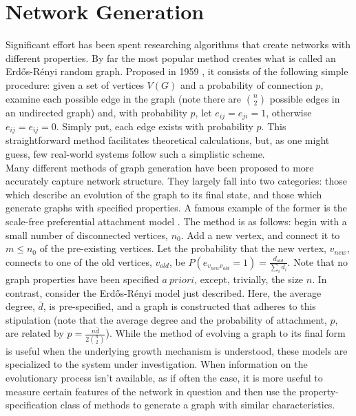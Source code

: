 \documentclass[11pt]{article}
\begin{document}
\section{Network Generation}
\label{sec:netGen}
\indent Significant effort has been spent researching algorithms that create networks with different properties. By far the most popular method creates what is called an Erd\H{o}s-R\'{e}nyi random graph. Proposed in 1959 \cite{Erdos1959}, it consists of the following simple procedure: given a set of vertices $V(G)$ and a probability of connection $p$, examine each possible edge in the graph (note there are ${n \choose 2}$ possible edges in an undirected graph) and, with probability $p$, let $e_{ij}=e_{ji}=1$, otherwise $e_{ij}=e_{ij}=0$. Simply put, each edge exists with probability $p$. This straightforward method facilitates theoretical calculations, but, as one might guess, few real-world systems follow such a simplistic scheme. \vspace{1mm}\\
\indent Many different methods of graph generation have been proposed to more accurately capture network structure. They largely fall into two categories: those which describe an evolution of the graph to its final state, and those which generate graphs with specified properties. A famous example of the former is the scale-free preferential attachment model \cite{Barabasi1999}. The method is as follows: begin with a small number of disconnected vertices, $n_{0}$. Add a new vertex, and connect it to $m\le n_{0}$ of the pre-existing vertices. Let the probability that the new vertex, $v_{new}$, connects to one of the old vertices, $v_{old}$, be $P(e_{v_{new}v_{old}}=1)=\frac{d_{old}}{\sum\limits_{i} d_{i}}$. Note that no graph properties have been specified $a\ priori$, except, trivially, the size $n$. In contrast, consider the Erd\H{o}s-R\'{e}nyi model just described. Here, the average degree, $\bar{d}$, is pre-specified, and a graph is constructed that adheres to this stipulation (note that the average degree and the probability of attachment, $p$, are related by $p=\frac{n\bar{d}}{2 {n \choose 2}}$). While the method of evolving a graph to its final form is useful when the underlying growth mechanism is understood, these models are specialized to the system under investigation. When information on the evolutionary process isn't available, as if often the case, it is more useful to measure certain features of the network in question and then use the property-specification class of methods to generate a graph with similar characteristics.\vspace{1mm}\\
\end{document}
